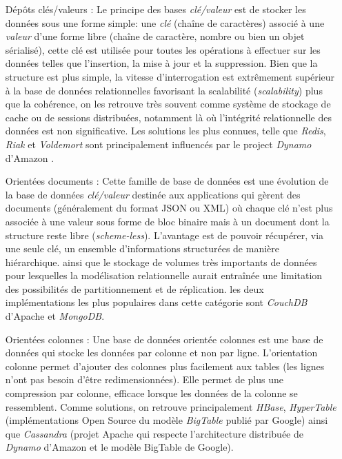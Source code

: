   \begin{itemize}
  \item [Dépôts clés/valeurs]: Le principe des bases
    \textit{clé/valeur} est de stocker les données sous une forme
    simple: une \emph{clé } (chaîne de caractères) associé à une
    \emph{valeur} d'une forme libre (chaîne de caractère, nombre ou
    bien un objet sérialisé), cette clé est utilisée pour toutes les
    opérations à effectuer sur les données telles que l'insertion, la
    mise à jour et la suppression. Bien que la structure est plus
    simple, la vitesse d'interrogation est extrêmement supérieur à la
    base de données relationnelles favorisant la scalabilité
    (\emph{scalability}) plus que la cohérence, on les retrouve très
    souvent comme système de stockage de cache ou de sessions
    distribuées, notamment là où l'intégrité relationnelle des données
    est non significative. Les solutions les plus connues, telle que
    \emph{Redis}, \emph{Riak} et \emph{Voldemort} sont principalement
    influencés par le project \emph{Dynamo} d'Amazon
    \cite{decandia2007dynamo}.

  \item [Orientées documents]: Cette famille de base de données est
    une évolution de la base de données \textit{clé/valeur} destinée
    aux applications qui gèrent des documents (généralement du format
    \textsc{JSON} ou \textsc{XML}) où chaque clé n'est plus associée à
    une valeur sous forme de bloc binaire mais à un document dont la
    structure reste libre (\textit{scheme-less}). L'avantage est de
    pouvoir récupérer, via une seule clé, un ensemble d’informations
    structurées de manière hiérarchique. ainsi que le stockage de
    volumes très importants de données pour lesquelles la modélisation
    relationnelle aurait entraînée une limitation des possibilités de
    partitionnement et de réplication. les deux implémentations les
    plus populaires dans cette catégorie sont \emph{CouchDB} d'Apache
    et \emph{MongoDB}.

  \item [Orientées colonnes]: Une base de données orientée colonnes
    est une base de données qui stocke les données par colonne et non
    par ligne. L'orientation colonne permet d'ajouter des colonnes
    plus facilement aux tables (les lignes n'ont pas besoin d'être
    redimensionnées). Elle permet de plus une compression par colonne,
    efficace lorsque les données de la colonne se ressemblent. Comme
    solutions, on retrouve principalement \emph{HBase},
    \emph{HyperTable} (implémentations Open Source du modèle
    \emph{BigTable} \cite{chang2008bigtable} publié par Google) ainsi
    que \emph{Cassandra} (projet Apache qui respecte l'architecture
    distribuée de \emph{Dynamo} \cite{decandia2007dynamo} d'Amazon et
    le modèle BigTable de Google).


\end{itemize}
